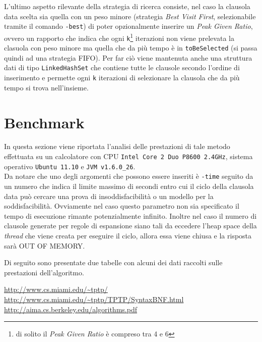 \documentclass[a4paper,11pt]{article}
\makeatletter
\let\@orig@endthebibliography\endthebibliography
\renewcommand\endthebibliography{
\xdef\@kept@last@number{\the\c@enumiv}
\@orig@endthebibliography}
\newenvironment{thesitography}[1]
{\def\refname{Siti consultati}%
\thebibliography{#1}%
\setcounter{enumiv}{\@kept@last@number}%
}
	{\@orig@endthebibliography}
\makeatother
\begin{document}
L'ultimo aspetto rilevante della strategia di ricerca consiste, nel caso la clausola data scelta sia quella con un peso minore (strategia \emph{Best Visit First}, selezionabile tramite il comando \texttt{-best}) di poter opzionalmente inserire un \emph{Peak Given Ratio}, ovvero un rapporto che indica che ogni \texttt{k}\footnote{di solito il \emph{Peak Given Ratio} è compreso tra 4 e 6} iterazioni non viene prelevata la clasuola con peso minore ma quella che da più tempo è in \texttt{toBeSelected} (si passa quindi ad una strategia FIFO). Per far ciò viene mantenuta anche una struttura dati di tipo \texttt{LinkedHashSet} che contiene tutte le clausole secondo l'ordine di inserimento e permette ogni \texttt{k} iterazioni di selezionare la clausola che da più tempo si trova nell'insieme.

\section{Benchmark}
In questa sezione viene riportata l'analisi delle prestazioni di tale metodo effettuata su un calcolatore con CPU \texttt{Intel Core 2 Duo P8600 2.4GHz}, sistema operativo \texttt{Ubuntu 11.10} e \texttt{JVM v1.6.0\_26}.\\
Da notare che uno degli argomenti che possono essere inseriti è \texttt{-time} seguito da un numero che indica il limite massimo di secondi entro cui il ciclo della clausola data può cercare una prova di insoddisfacibilità o un modello per la soddisfacibilità. Ovviamente nel caso questo parametro non sia specificato il tempo di esecuzione rimante potenzialmente infinito. Inoltre nel caso il numero di clausole generate per regole di espansione siano tali da eccedere l'heap space della \emph{thread} che viene creata per eseguire il ciclo, allora essa viene chiusa e la risposta sarà OUT OF MEMORY.\par
Di seguito sono presentate due tabelle con alcuni dei dati raccolti sulle prestazioni dell'algoritmo.

\begin{thesitography}{9}
\url{http://www.cs.miami.edu/~tptp/}
\url{http://www.cs.miami.edu/~tptp/TPTP/SyntaxBNF.html}		
\url{http://aima.cs.berkeley.edu/algorithms.pdf}
\end{thesitography}
\end{document}

